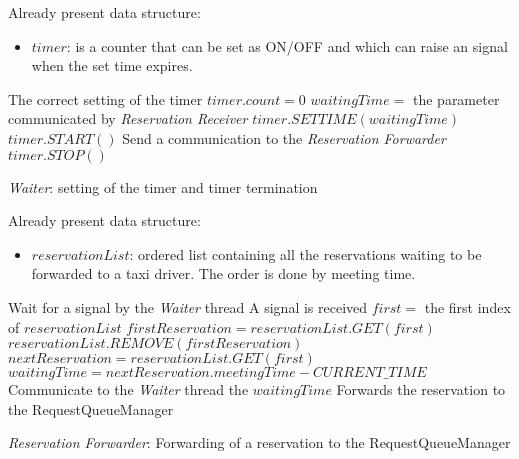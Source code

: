 \begin{algorithm}
\begin{algorithmic}
\REQUIRE Already present data structure:
\begin{itemize}
	\item $timer$: is a counter that can be set as ON/OFF and which can raise an signal when the set time expires.
\end{itemize}
\ENSURE The correct setting of the timer
\STATE $timer.count = 0$ 
		\STATE $waitingTime=$ the parameter communicated by \textit{Reservation Receiver}
		\STATE $timer.SETTIME(waitingTime)$
		\STATE $timer.START()$
	\ENDIF
		\STATE Send a communication to the \textit{Reservation Forwarder}
		\STATE $timer.STOP()$
	\ENDIF
\ENDWHILE
\end{algorithmic}
\caption{\textit{Waiter}: setting of the timer and timer termination}
\end{algorithm}

\begin{algorithm}

\begin{algorithmic}
\REQUIRE Already present data structure:
\begin{itemize}
	\item $reservationList$: ordered list containing all the reservations waiting to be forwarded to a taxi driver. The order is done by meeting time.
\end{itemize}
	\STATE Wait for a signal by the \textit{Waiter} thread
	\STATE A signal is received
	\STATE $first=$ the first index of $reservationList$
	\STATE $firstReservation=reservationList.GET(first)$ 
	\STATE $reservationList.REMOVE(firstReservation)$ 
	\STATE $nextReservation = reservationList.GET(first)$
	\STATE $waitingTime = nextReservation.meetingTime - CURRENT\_TIME$
	\STATE Communicate to the \textit{Waiter} thread the $waitingTime$
	\STATE Forwards the reservation to the RequestQueueManager
\ENDWHILE

\end{algorithmic}

\caption{\textit{Reservation Forwarder}: Forwarding of a reservation to the RequestQueueManager}
\end{algorithm}
